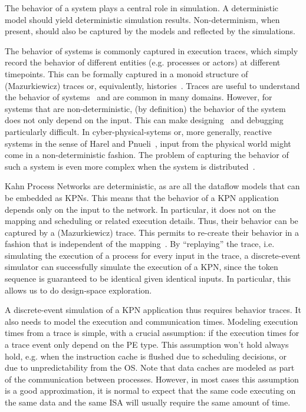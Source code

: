 The behavior of a system plays a central role in simulation. A deterministic model should yield deterministic simulation results.
Non-determinism, when present, should also be captured by the models and reflected by the simulations.

The behavior of systems is commonly captured in execution traces, which simply record the behavior of different entities (e.g. processes or actors) at different timepoints.
This can be formally captured in a monoid structure of (Mazurkiewicz) traces or, equivalently, histories~\cite{diekert1995book}.
Traces are useful to understand the behavior of systems~\cite{vampir} and are common in many domains.
However, for systems that are non-deterministic, (by definition) the behavior of the system does not only depend on the input.
This can make designing~\cite{lee2006problem} and debugging~\cite{murillo_debugging} particularly difficult.
In cyber-physical-sytems or, more generally, reactive systems in the sense of Harel and Pnueli~\cite{harel_pnueli_reactive}, input from the physical world might come in a non-deterministic fashion.
The problem of capturing the behavior of such a system is even more complex when the system is distributed~\cite{shaver_phdthesis}. 

Kahn Process Networks are deterministic, as are all the dataflow models that can be embedded as KPNs.
This means that the behavior of a KPN application depends only on the input to the network.
In particular, it does not on the mapping and scheduling or related execution details.
Thus, their behavior can be captured by a (Mazurkiewicz) trace.
This permits to re-create their behavior in a fashion that is independent of the mapping~\cite{find_proper_references}.
By ``replaying'' the trace, i.e. simulating the execution of a process for every input in the trace, a discrete-event simulator can successfully simulate the execution of a KPN, since the token sequence is guaranteed to be identical given identical inputs.
In particular, this allows us to do design-space exploration.

A discrete-event simulation of a KPN application thus requires behavior traces. It also needs to model the execution and communication times.
Modeling execution times from a trace is simple, with a crucial assumption: if the execution times for a trace event only depend on the PE type.
This assumption won't hold always hold, e.g. when the instruction cache is flushed due to scheduling decisions, or due to unpredictability from the \ac{OS}.
Note that data caches are modeled as part of the communication between processes.
However, in most cases this assumption is a good approximation, it is normal to expect that the same code executing on the same data and the same \ac{ISA} will usually require the same amount of time.

